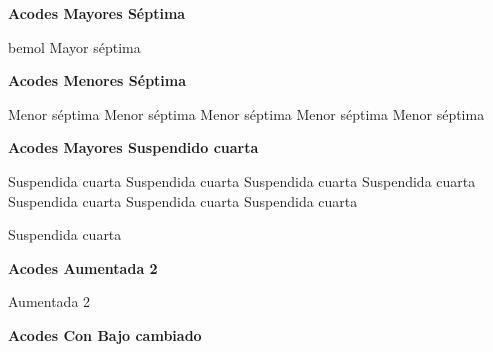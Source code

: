 \vskip 20pt
\textbf{Acodes Mayores S\'eptima}
\vskip 25pt

\small
{} \qquad\qquad {} \qquad {} \qquad\qquad
\vskip 25pt
 \qquad\qquad {}
\vskip 25pt
  \qquad\qquad {} bemol Mayor s\'eptima
\normalsize
\vskip 20pt

\textbf{Acodes Menores S\'eptima}
\vskip 25pt

\small
{} Menor s\'eptima
 Menor s\'eptima
 Menor s\'eptima
 Menor s\'eptima
\vskip 25pt
 Menor s\'eptima
\normalsize

\vskip 20pt

\textbf{Acodes Mayores Suspendido cuarta}

\small
{} Suspendida cuarta
 Suspendida cuarta
 Suspendida cuarta
 Suspendida cuarta
 Suspendida cuarta
 Suspendida cuarta
 Suspendida cuarta

 Suspendida cuarta
\normalsize

\vskip 20pt
\textbf{Acodes Aumentada 2}
\vskip 25pt

\small
{} Aumentada 2
\normalsize

\vskip 20pt
\textbf{Acodes Con Bajo cambiado}
\vskip 25pt

\small
{}
\vskip 20pt
\normalsize

\clearpage
\fi
%
